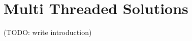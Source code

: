 \section{Multi Threaded Solutions}
\label{section: Multi Threaded Solutions}

(TODO: write introduction)